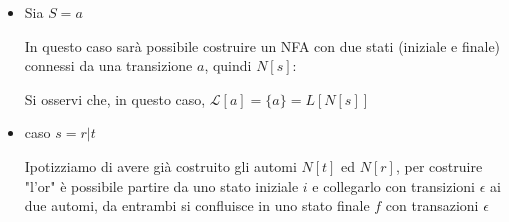 {\begin{itemize}
\begin{center}
        \end{center}
        Si osservi che, in questo caso, $\mathcal{L}[\epsilon] = \{\epsilon\}=L[N[s]]$
        \item Sia $S = a$
        
        In questo caso sarà possibile costruire un NFA con due stati (iniziale e finale) connessi da una transizione $a$, quindi $N[s]$:

        \begin{center}
        \end{center}

        Si osservi che, in questo caso, $\mathcal{L}[a] = \{a\}=L[N[s]]$
        \item caso $s= r|t$
        
        Ipotizziamo di avere già costruito gli automi $N[t]$ ed $N[r]$, per costruire "l'or" è possibile partire da uno stato iniziale $i$ e collegarlo con transizioni $\epsilon$ ai due automi, da entrambi si confluisce in uno stato finale $f$ con transazioni $\epsilon$
        
        \begin{center}
\end{center}
\end{itemize}}
